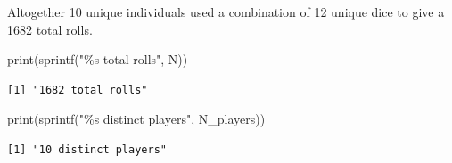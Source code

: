\documentclass[
  letterpaper,
  DIV=11,
  numbers=noendperiod]{scrartcl}
\newenvironment{Shaded}{\begin{snugshade}}{\end{snugshade}}
\newcommand{\FunctionTok}[1]{\textcolor[rgb]{0.28,0.35,0.67}{#1}}
\newcommand{\NormalTok}[1]{\textcolor[rgb]{0.00,0.23,0.31}{#1}}
\newcommand{\OtherTok}[1]{\textcolor[rgb]{0.00,0.23,0.31}{#1}}
\newcommand{\SpecialCharTok}[1]{\textcolor[rgb]{0.37,0.37,0.37}{#1}}
\newcommand{\StringTok}[1]{\textcolor[rgb]{0.13,0.47,0.30}{#1}}
\begin{document}
\begin{Shaded}
\end{Shaded}

Altogether 10 unique individuals used a combination of 12 unique dice to
give a 1682 total rolls.

\begin{Shaded}
\begin{Highlighting}[]
\FunctionTok{print}\NormalTok{(}\FunctionTok{sprintf}\NormalTok{(}\StringTok{"\%s total rolls"}\NormalTok{, N))}
\end{Highlighting}
\end{Shaded}

\begin{verbatim}
[1] "1682 total rolls"
\end{verbatim}

\begin{Shaded}
\begin{Highlighting}[]
\FunctionTok{print}\NormalTok{(}\FunctionTok{sprintf}\NormalTok{(}\StringTok{"\%s distinct players"}\NormalTok{, N\_players))}
\end{Highlighting}
\end{Shaded}

\begin{verbatim}
[1] "10 distinct players"
\end{verbatim}
\end{document}
